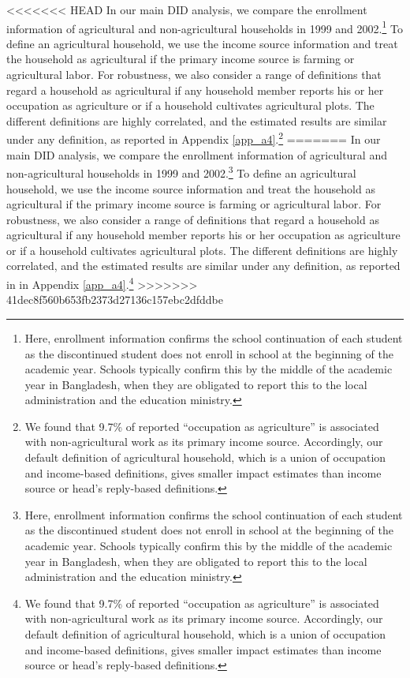 \documentclass[12pt,letterpaper]{article}
\newcommand{\0}{\ensuremath{\mbox{\boldmath $0$}}}
\begin{document}
<<<<<<< HEAD
In our main DID analysis, we compare the enrollment information of agricultural and non-agricultural households in 1999 and 2002.\footnote{Here, enrollment information confirms the school continuation of each student as the discontinued student does not enroll in school at the beginning of the academic year. Schools typically confirm this by the middle of the academic year in Bangladesh, when they are obligated to report this to the local administration and the education ministry. } To define an agricultural household, we use the income source information and treat the household as agricultural if the primary income source is farming or agricultural labor. For robustness, we also consider a range of definitions that regard a household as agricultural if any household member reports his or her occupation as agriculture or if a household cultivates agricultural plots. The different definitions are highly correlated, and the estimated results are similar under any definition, as reported in Appendix \ref{app_a4}.\footnote{We found that 9.7\% of reported ``occupation as agriculture'' is associated with non-agricultural work as its primary income source. Accordingly, our default definition of agricultural household, which is a union of occupation and income-based definitions, gives smaller impact estimates than income source or head's reply-based definitions. }
=======
In our main DID analysis, we compare the enrollment information of agricultural and non-agricultural households in 1999 and 2002.\footnote{Here, enrollment information confirms the school continuation of each student as the discontinued student does not enroll in school at the beginning of the academic year. Schools typically confirm this by the middle of the academic year in Bangladesh, when they are obligated to report this to the local administration and the education ministry. } To define an agricultural household, we use the income source information and treat the household as agricultural if the primary income source is farming or agricultural labor. For robustness, we also consider a range of definitions that regard a household as agricultural if any household member reports his or her occupation as agriculture or if a household cultivates agricultural plots. The different definitions are highly correlated, and the estimated results are similar under any definition, as reported in in Appendix \ref{app_a4}.\footnote{We found that 9.7\% of reported ``occupation as agriculture'' is associated with non-agricultural work as its primary income source. Accordingly, our default definition of agricultural household, which is a union of occupation and income-based definitions, gives smaller impact estimates than income source or head's reply-based definitions. }
>>>>>>> 41dec8f560b653fb2373d27136c157ebc2dfddbe
\end{document}
